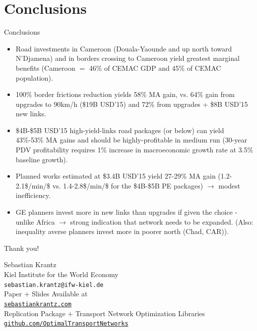 \documentclass[aspectratio=169,xcolor=dvipsnames]{beamer}
\begin{document}
\section{Conclusions}

\begin{frame}{Conclusions}
  \begin{itemize} 
  	\item Road investments in Cameroon (Douala-Yaounde and up north toward N'Djamena) and in borders crossing to Cameroon yield greatest marginal benefits (Cameroon $=$ 46\% of CEMAC GDP and 45\% of CEMAC population).
  	\item 100\% border frictions reduction yields 58\% MA gain, vs. 64\% gain from upgrades to 90km/h (\$19B USD'15) and 72\% from upgrades + \$8B USD'15 new links. 
  	\item \$4B-\$5B USD'15 high-yield-links road packages (or below) can yield 43\%-53\% MA gains and should be highly-profitable in medium run (30-year PDV profitability requires 1\% increase in macroeconomic growth rate at 3.5\% baseline growth). 
  	\item Planned works estimated at \$3.4B USD'15 yield 27-29\% MA gain (1.2-2.1\$/min/\$ vs. 1.4-2.8\$/min/\$ for the \$4B-\$5B PE packages) $\to$ modest inefficiency.
    \item GE planners invest more in new links than upgrades if given the choice - unlike Africa \citep{krantz2024optimal} $\to$ strong indication that network needs to be expanded. (Also: inequality averse planners invest more in poorer north (Chad, CAR)).
  \end{itemize}
\end{frame}

\setcounter{totalframecount}{\value{framenumber}}

\begin{frame}[plain]
  \centering
    \vspace{0.8cm}
   \huge{\color{RoyalBlue}Thank you!}
   
  \vspace{0.5cm}
  
  \large{Sebastian Krantz}\\
  \small{Kiel Institute for the World Economy}\\
  \small{\texttt{sebastian.krantz@ifw-kiel.de}}\\ \vspace{1em}
  \small{Paper $+$ Slides Available at}\\
  \small{\href{https://sebastiankrantz.com}{\texttt{sebastiankrantz.com}}}\\ \vspace{1em}
  \small{Replication Package $+$ Transport Network Optimization Libraries}\\
  \small{\href{https://github.com/OptimalTransportNetworks}{\texttt{github.com/OptimalTransportNetworks}}}\\
  \vspace{0.3cm}
\end{frame}
\end{document}
